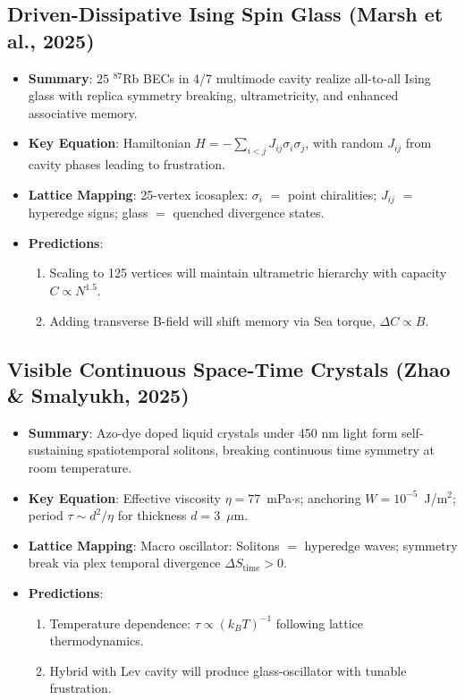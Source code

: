 \documentclass[11pt,a4paper]{article}
\begin{document}
\subsection{Driven-Dissipative Ising Spin Glass (Marsh et al., 2025)}

\begin{itemize}
\item \textbf{Summary}: $25$ $^{87}$Rb BECs in 4/7 multimode cavity realize all-to-all Ising glass with replica symmetry breaking, ultrametricity, and enhanced associative memory.

\item \textbf{Key Equation}: Hamiltonian $H = -\sum_{i<j} J_{ij} \sigma_i \sigma_j$, with random $J_{ij}$ from cavity phases leading to frustration.

\item \textbf{Lattice Mapping}: 25-vertex icosaplex: $\sigma_i$ $=$ point chiralities; $J_{ij}$ $=$ hyperedge signs; glass $=$ quenched divergence states.

\item \textbf{Predictions}:
\begin{enumerate}
\item Scaling to 125 vertices will maintain ultrametric hierarchy with capacity $C \propto N^{1.5}$.
\item Adding transverse B-field will shift memory via Sea torque, $\Delta C \propto B$.
\end{enumerate}
\end{itemize}

\subsection{Visible Continuous Space-Time Crystals (Zhao \& Smalyukh, 2025)}

\begin{itemize}
\item \textbf{Summary}: Azo-dye doped liquid crystals under 450 nm light form self-sustaining spatiotemporal solitons, breaking continuous time symmetry at room temperature.

\item \textbf{Key Equation}: Effective viscosity $\eta = 77$~mPa$\cdot$s; anchoring $W = 10^{-5}$~J/m$^2$; period $\tau \sim d^2 / \eta$ for thickness $d=3$~$\mu$m.

\item \textbf{Lattice Mapping}: Macro oscillator: Solitons $=$ hyperedge waves; symmetry break via plex temporal divergence $\Delta S_{\mathrm{time}} > 0$.

\item \textbf{Predictions}:
\begin{enumerate}
\item Temperature dependence: $\tau \propto (k_B T)^{-1}$ following lattice thermodynamics.
\item Hybrid with Lev cavity will produce glass-oscillator with tunable frustration.
\end{enumerate}
\end{itemize}
\end{document}
